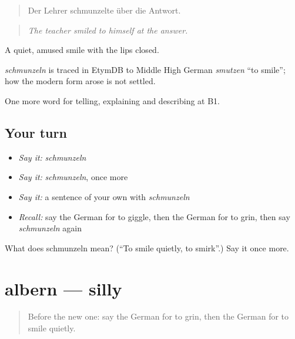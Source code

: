 \begin{quote}
Der Lehrer schmunzelte über die Antwort.
\end{quote}

\begin{quote}
\emph{The teacher smiled to himself at the answer.}
\end{quote}

A quiet, amused smile with the lips closed.

\begin{cousinweb}
\emph{schmunzeln} is traced in EtymDB to Middle High German \emph{smutzen} \textquotedblleft{}to smile\textquotedblright{}; how the modern form arose is not settled.
\end{cousinweb}

\begin{grammarlens}[title={What you've built}]
One more word for telling, explaining and describing at B1.
\end{grammarlens}

\subsection*{Your turn}
\begin{itemize}
\raggedright
  \item \emph{Say it:} \emph{schmunzeln}
  \item \emph{Say it:} \emph{schmunzeln}, once more
  \item \emph{Say it:} a sentence of your own with \emph{schmunzeln}
  \item \emph{Recall:} say the German for to giggle, then the German for to grin, then say \emph{schmunzeln} again
\end{itemize}

\begin{tcolorbox}[breakable,colback=teal!4,colframe=teal!35!black,title={Before you move on}]
What does schmunzeln mean? (\textquotedblleft{}To smile quietly, to smirk\textquotedblright{}.) Say it once more.
\end{tcolorbox}
\section[albern]{albern — silly}

\label{lesson:GE-C473-albern}



\begin{quote}
Before the new one: say the German for to grin, then the German for to smile quietly.
\end{quote}

